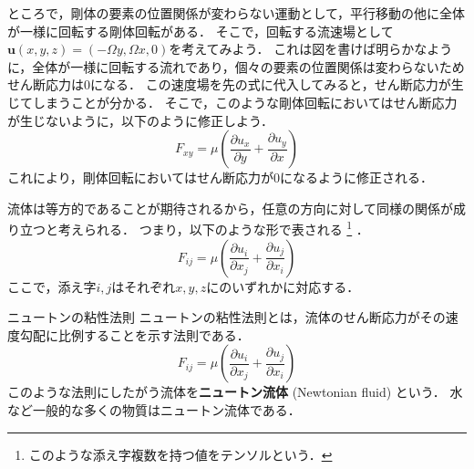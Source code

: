 \documentclass[uplatex,dvipdfmx,a4j,11pt]{jsreport}
\newcommand{\keyword}[1]{\textcolor{mainblue}{\textbf{#1}}}
\numberwithin{equation}{chapter}
\begin{document}
ところで，剛体の要素の位置関係が変わらない運動として，平行移動の他に全体が一様に回転する剛体回転がある．
そこで，回転する流速場として$\mathbf{u}(x, y, z) = (-\Omega y, \Omega x, 0)$を考えてみよう．
これは図を書けば明らかなように，全体が一様に回転する流れであり，個々の要素の位置関係は変わらないためせん断応力は$0$になる．
この速度場を先の式に代入してみると，せん断応力が生じてしまうことが分かる．
そこで，このような剛体回転においてはせん断応力が生じないように，以下のように修正しよう．
\begin{equation*}
  F_{xy} = \mu \left(\frac{\partial u_x}{\partial y} + \frac{\partial u_y}{\partial x}\right)
\end{equation*}
これにより，剛体回転においてはせん断応力が$0$になるように修正される．

流体は等方的であることが期待されるから，任意の方向に対して同様の関係が成り立つと考えられる．
つまり，以下のような形で表される
\footnote{このような添え字複数を持つ値をテンソルという．}
．
\begin{equation*}
  F_{ij} = \mu\left(\frac{\partial u_i}{\partial x_j} + \frac{\partial u_j}{\partial x_i}\right)
\end{equation*}
ここで，添え字$i, j$はそれぞれ$x, y, z$にのいずれかに対応する．


\begin{definition}{ニュートンの粘性法則}{}{}
  ニュートンの粘性法則とは，流体のせん断応力がその速度勾配に比例することを示す法則である．
  \begin{equation}
    F_{ij} = \mu\left(\frac{\partial u_i}{\partial x_j} + \frac{\partial u_j}{\partial x_i}\right)
  \end{equation}
  このような法則にしたがう流体を\keyword{ニュートン流体} (Newtonian fluid) という．
  水など一般的な多くの物質はニュートン流体である．
\end{definition}

\enskip
\end{document}

